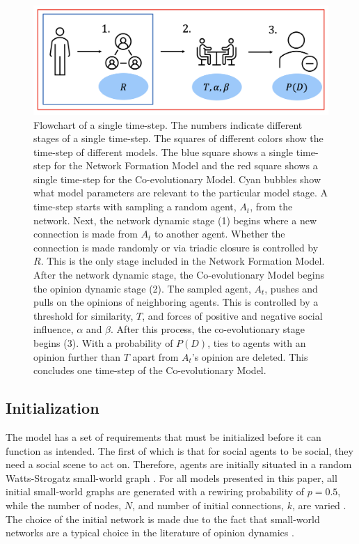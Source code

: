 \documentclass[11pt]{article}
\begin{document}
\begin{figure}[H]
  \centering
  \includegraphics[width=.9\linewidth]{../plots/schematics/model_representation.png}
\caption{Flowchart of a single time-step. The numbers indicate different stages of a single time-step. The squares of different colors show the time-step of different models. The blue square shows a single time-step for the Network Formation Model and the red square shows a single time-step for the Co-evolutionary Model. Cyan bubbles show what model parameters are relevant to the particular model stage. A time-step starts with sampling a random agent, $A_t$, from the network. Next, the network dynamic stage (1) begins where a new connection is made from $A_t$ to another agent. Whether the connection is made randomly or via triadic closure is controlled by $R$. This is the only stage included in the Network Formation Model. After the network dynamic stage, the Co-evolutionary Model begins the opinion dynamic stage (2). The sampled agent, $A_t$, pushes and pulls on the opinions of neighboring agents. This is controlled by a threshold for similarity, $T$, and forces of positive and negative social influence, $\alpha$ and $\beta$. After this process, the co-evolutionary stage begins (3). With a probability of $P(D)$, ties to agents with an opinion further than $T$ apart from $A_t$'s opinion are deleted. This concludes one time-step of the Co-evolutionary Model.}
\label{fig:flowchart}
\end{figure}

\subsection{Initialization}
The model has a set of requirements that must be initialized before it can function as intended. The first of which is that for social agents to be social, they need a social scene to act on. Therefore, agents are initially situated in a random Watts-Strogatz small-world graph \cite{watts_collective_1998}. For all models presented in this paper, all initial small-world graphs are generated with a rewiring probability of $p=0.5$, while the number of nodes, $N$, and number of initial connections, $k$, are varied \cite{watts_collective_1998}. The choice of the initial network is made due to the fact that small-world networks are a typical choice in the literature of opinion dynamics \cite{turner_paths_2018, flache_models_2017}.
\end{document}
